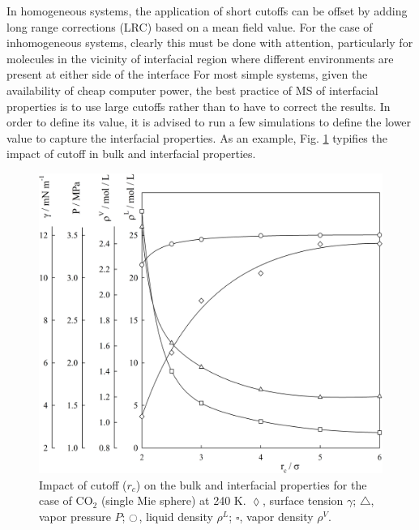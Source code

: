 \documentclass[9pt,bestpractices]{livecoms}
\begin{document}
In homogeneous systems, the application of short cutoffs can be offset by
adding long range corrections (LRC) based on a mean field value. For the case
of inhomogeneous systems, clearly this must be done with attention,
particularly for molecules in the vicinity of interfacial region where
different environments are present at either side of the interface
\citep{lotfi1990,janecek2006,siperstein2002,lishchuk2018}
For most simple systems, given the
availability of cheap computer power, the best practice of MS of interfacial
properties is to use large cutoffs rather than to have to correct the results. In
order to define its value, it is advised to run a few simulations to define the
lower value to capture the interfacial properties. As an example, Fig. \ref{fig:11}
typifies the impact of cutoff in bulk and interfacial properties. 

\begin{figure}
  \centering
\includegraphics[width=\linewidth]{gfx/fig_11_op4.JPG}
\caption{Impact of cutoff ($r_{c}$) on the bulk and interfacial properties for the case of CO$_{2}$ (single Mie sphere) at 240 K. $\lozenge$, surface tension $\gamma$; $\triangle$, vapor pressure $P$; $\ocircle$, liquid density $\rho^L$; $\square$, vapor density $\rho^V$.}
\label{fig:11}
\end{figure}
\end{document}
